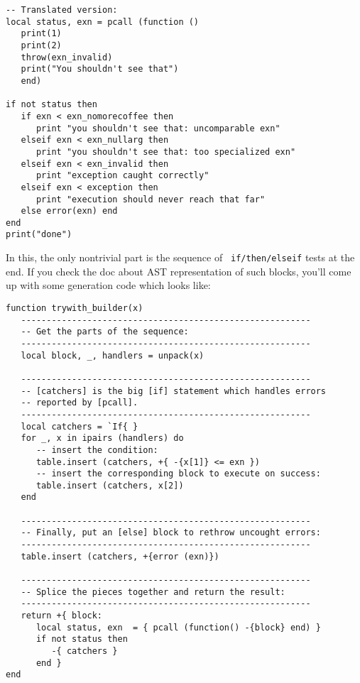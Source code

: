 \begin{verbatim}
-- Translated version:
local status, exn = pcall (function ()
   print(1)
   print(2)
   throw(exn_invalid)
   print("You shouldn't see that")
   end)

if not status then
   if exn < exn_nomorecoffee then
      print "you shouldn't see that: uncomparable exn"
   elseif exn < exn_nullarg then
      print "you shouldn't see that: too specialized exn"
   elseif exn < exn_invalid then
      print "exception caught correctly"
   elseif exn < exception then
      print "execution should never reach that far"
   else error(exn) end
end 
print("done")
\end{verbatim}

In this, the only nontrivial part is the sequence of {\tt
  if/then/elseif} tests at the end. If you check the doc about AST
representation of such blocks, you'll come up with some generation
code which looks like:

\pagebreak

\begin{verbatim}
function trywith_builder(x)
   ---------------------------------------------------------
   -- Get the parts of the sequence:
   ---------------------------------------------------------
   local block, _, handlers = unpack(x)

   ---------------------------------------------------------
   -- [catchers] is the big [if] statement which handles errors
   -- reported by [pcall].
   ---------------------------------------------------------
   local catchers = `If{ }
   for _, x in ipairs (handlers) do
      -- insert the condition:
      table.insert (catchers, +{ -{x[1]} <= exn })
      -- insert the corresponding block to execute on success:
      table.insert (catchers, x[2])
   end

   ---------------------------------------------------------
   -- Finally, put an [else] block to rethrow uncought errors:
   ---------------------------------------------------------
   table.insert (catchers, +{error (exn)})

   ---------------------------------------------------------
   -- Splice the pieces together and return the result:
   ---------------------------------------------------------
   return +{ block:
      local status, exn  = { pcall (function() -{block} end) }
      if not status then
         -{ catchers }
      end }
end
\end{verbatim}

